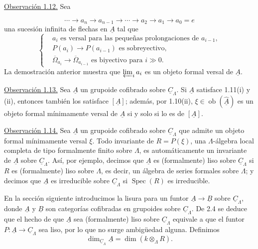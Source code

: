 \underline{Observación 1.12.} Sea


\[
 \cdots\longrightarrow a_n\longrightarrow a_{n-1}
 \longrightarrow\cdots\longrightarrow a_2\longrightarrow a_1
 \longrightarrow a_0=e
\]
una sucesión infinita de flechas en $\underline A$ tal que
\[
\left\{
\begin{aligned}
&a_i\text{ es versal para las pequeñas prolongaciones de }a_{i-1},\\
&P(a_i)\longrightarrow P(a_{i-1})\text{ es sobreyectivo},\\
&\overline\Omega_{a_i}\longrightarrow
 \overline\Omega_{a_{i-1}}\text{ es biyectivo para }i\gg0.
\end{aligned}
\right.
\]
La demostración anterior muestra que $\varprojlim_i a_i$ es un objeto
formal versal de $\underline A$.

\underline{Observación 1.13.} Sea $\underline A$ un grupoide
cofibrado sobre $\underline C_\Lambda$. Si $\underline A$ satisface
1.11(i) y (ii), entonces también los satisface $[\underline A]$;
además, por 1.10(ii),
$\xi\in\operatorname{ob}(\widehat{\underline A})$ es un objeto formal
mínimamente versal de $\underline A$ si y solo si lo es de
$[\underline A]$.

\underline{Observación 1.14.} Sea $\underline A$ un grupoide
cofibrado sobre $\underline C_\Lambda$ que admite un objeto formal
mínimamente versal $\xi$. Todo invariante de $R=P(\xi)$, una
$\Lambda$-álgebra local completa de tipo formalmente finito sobre
$\Lambda$, es automáticamente un invariante de $\underline A$ sobre
$\underline C_\Lambda$. Así, por ejemplo, decimos que $\underline A$
es (formalmente) liso sobre $\underline C_\Lambda$ si $R$ es
(formalmente) liso sobre $\Lambda$, es decir, un álgebra de series
formales sobre $\Lambda$; y decimos que $\underline A$ es irreducible
sobre $\underline C_\Lambda$ si $\operatorname{Spec}(R)$ es
irreducible.

En la sección siguiente introducimos la lisura para un funtor
$\underline A\longrightarrow\underline B$ sobre
$\underline C_\Lambda$, donde $\underline A$ y $\underline B$ son
categorías cofibradas en grupoides sobre $\underline C_\Lambda$.
De 2.4 se deduce que el hecho de que $\underline A$ sea (formalmente)
liso sobre $\underline C_\Lambda$ equivale a que el funtor
$P:\underline A\longrightarrow\underline C_\Lambda$ sea liso, por
lo que no surge ambigüedad alguna. Definimos
\[
 \dim_{\underline C_\Lambda}\underline A
   =\dim(k\otimes_\Lambda R).
\]

